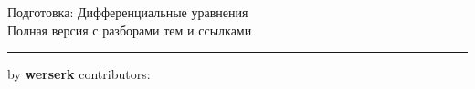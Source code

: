 \documentclass[11pt,a4paper]{article}
\newcommand{\topicsBase}{cheatsheets/math/differential-equations/preparation/topics}
\begin{document}
\begin{center}
  {\Huge Подготовка: Дифференциальные уравнения}\\[0.4cm]
  {\large Полная версия с разборами тем и ссылками}\\[0.2cm]
  \rule{\textwidth}{0.6pt}
\end{center}



% 
% 

\providecommand{\contributors}{}

{\noindent\tiny by \textbf{werserk} \hfill contributors: \texttt{\contributors}}
\end{document}
